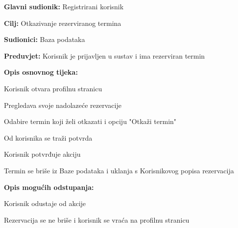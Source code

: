 				\noindent {}
				\begin{packed_item}
					
					\item \textbf{Glavni sudionik: }Registrirani korisnik
					\item  \textbf{Cilj:} Otkazivanje rezerviranog termina
					\item  \textbf{Sudionici:} Baza podataka
					\item  \textbf{Preduvjet:} Korisnik je prijavljen u sustav i ima rezerviran termin
					\item  \textbf{Opis osnovnog tijeka:}
					
					\item[] \begin{packed_enum}
						
						\item Korisnik otvara profilnu stranicu
						\item Pregledava svoje nadolazeće rezervacije
						\item Odabire termin koji želi otkazati i opciju "Otkaži termin"
						\item Od korisnika se traži potvrda
						\item Korisnik potvrđuje akciju
						\item Termin se briše iz Baze podataka i uklanja s Korisnikovog popisa rezervacija
					\end{packed_enum}
					
					\item  \textbf{Opis mogućih odstupanja:}
					
					\item[] \begin{packed_item}
						
						\item[5.a] Korisnik odustaje od akcije
						\item[] \begin{packed_enum}
							
							\item Rezervacija se ne briše i korisnik se vraća na profilnu stranicu
							
						\end{packed_enum}		
						
					\end{packed_item}
				\end{packed_item}
				
